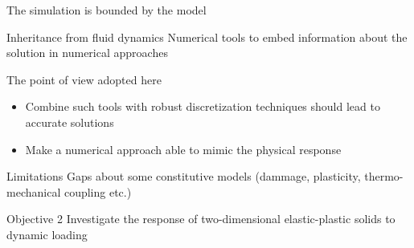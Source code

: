 
\begin{frame}{The simulation is bounded by the model}
  \begin{block}{Inheritance from fluid dynamics}
    Numerical tools to embed information about the solution in numerical approaches
  \end{block}
  \begin{block}{The point of view adopted here}
    \begin{itemize}
    \item Combine such tools with robust discretization techniques should lead to accurate solutions
    \item Make a numerical approach able to mimic the physical response
    \end{itemize}
  \end{block}
  \begin{block}{Limitations}
    Gaps about some constitutive models (dammage, plasticity, thermo-mechanical coupling etc.)
  \end{block}
  \begin{block}{Objective 2}
    Investigate the response of two-dimensional elastic-plastic solids to dynamic loading
  \end{block}
\end{frame}



